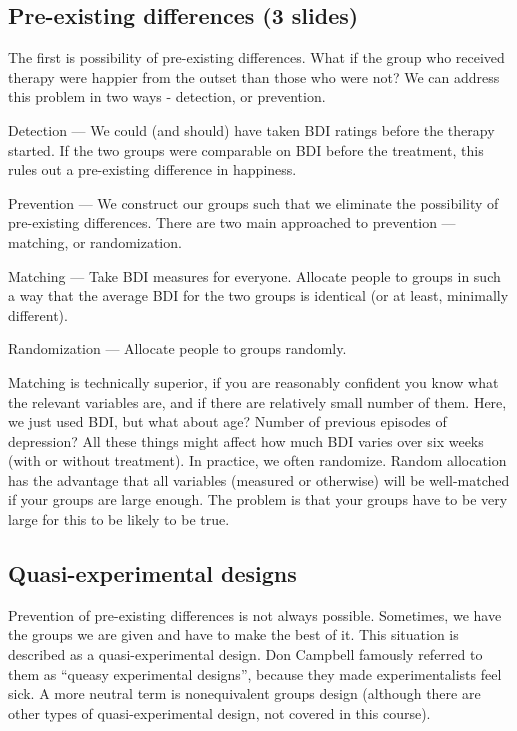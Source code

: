 \documentclass[12pt]{article}
\begin{document}
\subsection{Pre-existing differences (3 slides)}

The first is possibility of pre-existing differences. What if the
group who received therapy were happier from the outset than those who
were not? We can address this problem in two ways - detection, or
prevention.

Detection --- We could (and should) have taken BDI ratings before the
therapy started. If the two groups were comparable on BDI before the
treatment, this rules out a pre-existing difference in happiness.

Prevention --- We construct our groups such that we eliminate the
possibility of pre-existing differences. There are two main approached
to prevention --- matching, or randomization.

Matching --- Take BDI measures for everyone. Allocate people to groups
in such a way that the average BDI for the two groups is identical (or
at least, minimally different).

Randomization --- Allocate people to groups randomly.

Matching is technically superior, if you are reasonably confident you
know what the relevant variables are, and if there are relatively
small number of them. Here, we just used BDI, but what about age?
Number of previous episodes of depression? All these things might
affect how much BDI varies over six weeks (with or without
treatment). In practice, we often randomize. Random allocation has the
advantage that all variables (measured or otherwise) will be
well-matched if your groups are large enough. The problem is that your
groups have to be very large for this to be likely to be true.

\subsection{Quasi-experimental designs}

Prevention of pre-existing differences is not always
possible. Sometimes, we have the groups we are given and have to make
the best of it. This situation is described as a quasi-experimental
design. Don Campbell famously referred to them as ``queasy
experimental designs'', because they made experimentalists feel
sick. A more neutral term is nonequivalent groups design (although
there are other types of quasi-experimental design, not covered in
this course).
\end{document}

